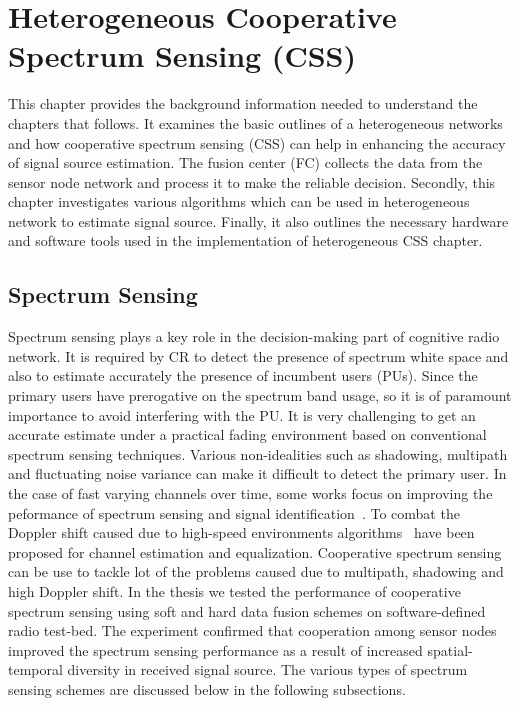 \chapter{Heterogeneous Cooperative Spectrum Sensing (CSS)}
\label{chapter3}

This chapter provides the background information needed to understand the chapters that follows. It examines the basic outlines of a heterogeneous networks and how cooperative spectrum sensing (CSS) can help in enhancing the accuracy of signal source estimation. The fusion center (FC) collects the data from the sensor node network and process it to make the reliable decision. Secondly, this chapter investigates various algorithms which can be used in heterogeneous network to estimate signal source. Finally, it also outlines the necessary hardware and software tools used in the implementation of heterogeneous CSS chapter.

\section{Spectrum Sensing}
Spectrum sensing plays a key role in the decision-making part of cognitive radio network. It is required by CR to detect the presence of spectrum white space and also to estimate accurately the presence of incumbent users (PUs). Since the primary users have prerogative on the spectrum band usage, so it is of paramount importance to avoid interfering with the PU. It is very challenging to get an accurate estimate under a practical fading environment based on conventional spectrum sensing techniques. Various non-idealities such as shadowing, multipath and fluctuating noise variance can make it difficult to detect the primary user. In the case of fast  varying  channels over time, some works focus on improving the peformance of spectrum sensing and signal identification~\cite{hassan2012blind,kharbech2013blind,hassan2009automatic}. To combat the Doppler shift caused due to high-speed environments algorithms~\cite{simon2013iterative} have been proposed for channel estimation and equalization. Cooperative spectrum sensing~\cite{ksgill} can be use to tackle lot of the problems caused due to multipath, shadowing and high Doppler shift. In the thesis we tested the performance of cooperative spectrum sensing using soft and hard data fusion schemes on software-defined radio test-bed. The experiment confirmed that cooperation among sensor nodes improved the spectrum sensing performance as a result of increased spatial-temporal diversity in received signal source. The various types of spectrum sensing schemes are discussed below in the following subsections.

